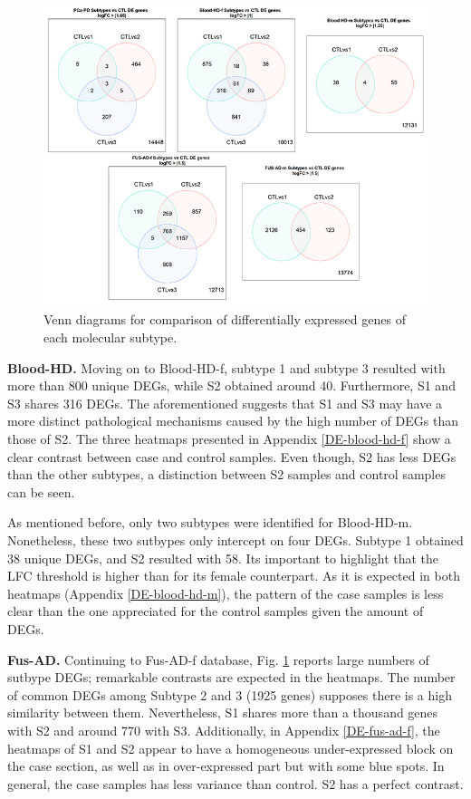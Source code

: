 \begin{figure}[ht]
    \centerline{\includegraphics[width = 15cm]{Figures/subtype-venn.jpg}}
\caption{Venn diagrams for comparison of differentially expressed genes of each molecular subtype.}
\label{fig:venn-subtypes}
\end{figure}

\textbf{Blood-HD.} Moving on to Blood-HD-f, subtype 1 and subtype 3 resulted with more than 800 unique DEGs, while S2 obtained around 40. Furthermore, S1 and S3 shares 316 DEGs. The aforementioned suggests that S1 and S3 may have a more distinct pathological mechanisms caused by the high number of DEGs than those of S2. The three heatmaps presented in Appendix \ref{DE-blood-hd-f} show a clear contrast between case and control samples. Even though, S2 has less DEGs than the other subtypes, a distinction between S2 samples and control samples can be seen.

As mentioned before, only two subtypes were identified for Blood-HD-m. Nonetheless, these two sutbypes only intercept on four DEGs. Subtype 1 obtained 38 unique DEGs, and S2 resulted with 58. Its important to highlight that the LFC threshold is higher than for its female counterpart. As it is expected in both heatmaps (Appendix \ref{DE-blood-hd-m}), the pattern of the case samples is less clear than the one appreciated for the control samples given the amount of DEGs.

\textbf{Fus-AD.} Continuing to Fus-AD-f database, Fig. \ref{fig:venn-subtypes} reports large numbers of sutbype DEGs; remarkable contrasts are expected in the heatmaps. The number of common DEGs among Subtype 2 and 3 (1925 genes) supposes there is a high similarity between them. Nevertheless, S1 shares more than a thousand genes with S2 and around 770 with S3. Additionally, in Appendix \ref{DE-fus-ad-f}, the heatmaps of S1 and S2 appear to have a homogeneous under-expressed block on the case section, as well as in over-expressed part but with some blue spots. In general, the case samples has less variance than control. S2 has a perfect contrast.

